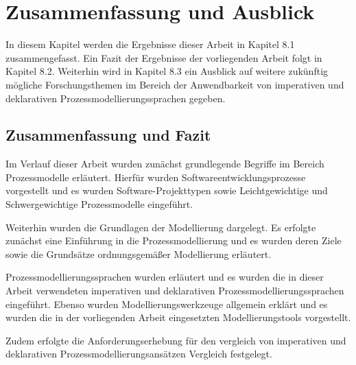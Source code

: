\chapter{Zusammenfassung und Ausblick}\label{sec:chapter8}
 In diesem Kapitel werden die Ergebnisse dieser Arbeit in Kapitel 8.1 zusammengefasst. Ein Fazit der Ergebnisse der vorliegenden Arbeit folgt in Kapitel 8.2. Weiterhin wird in Kapitel 8.3 ein Ausblick auf weitere zukünftig mögliche Forschungsthemen im Bereich der Anwendbarkeit von imperativen und deklarativen Prozessmodellierungssprachen gegeben.

\section{Zusammenfassung und Fazit}

Im Verlauf dieser Arbeit wurden zunächst grundlegende Begriffe im Bereich Prozessmodelle erläutert. Hierfür wurden Softwareentwicklungsprozesse vorgestellt und es wurden Software-Projekttypen sowie Leichtgewichtige und Schwergewichtige Prozessmodelle eingeführt.\newline

Weiterhin wurden die Grundlagen der Modellierung dargelegt. Es erfolgte zunächst eine Einführung in die Prozessmodellierung und es wurden deren Ziele sowie die Grundsätze ordnungsgemäßer Modellierung erläutert.\newline

Prozessmodellierungssprachen wurden erläutert und es wurden die in dieser Arbeit verwendeten imperativen und deklarativen Prozessmodellierungssprachen eingeführt. Ebenso wurden Modellierungswerkzeuge allgemein erklärt und es wurden die in der vorliegenden Arbeit eingesetzten Modellierungstools vorgestellt.\newline

Zudem erfolgte die Anforderungserhebung für den vergleich von imperativen und deklarativen Prozessmodellierungsansätzen Vergleich festgelegt.\newline


